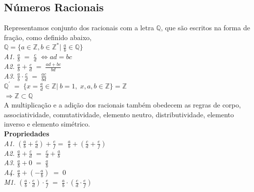 \noindent
\subsection{Números Racionais}

\noindent
Representamos conjunto dos racionais com a letra $\mathbb{Q}$, que são escritos na forma de fração, como definido abaixo, \\

\noindent
$\mathbb{Q} = \{ a \in \mathbb{Z}, b \in \mathbb{Z^*}| \; \frac{a}{b} \in \mathbb{Q} \} $ \\

\noindent
\emph{A1.} $ \frac{a}{b} \; = \; \frac{c}{d}$  $\Leftrightarrow ad = bc $ \\
\noindent
\emph{A2.} $\frac{a}{b} + \frac{c}{d} \; = \; \frac{ ad + bc }{bd}$ \\
\noindent
\emph{A3.} $ \frac{a}{b} \cdot \frac{c}{d} \; = \; \frac{ac}{bd}$ \\


\noindent
$ \mathbb{Q^{'}} \; = \; \{ x = \frac{a}{d} \in \mathbb{Z} | \ b = 1, \; x, a, b \in \mathbb{Z} \} = \mathbb{Z}  $ \\
$ \Rightarrow \mathbb{Z} \subset \mathbb{Q} $ \\

A multiplicação e a adição dos racionais também obedecem as regras de corpo, associatividade, comutatividade, elemento neutro, distributividade, elemento inverso e elemento simétrico.\\

\noindent
\textbf{Propriedades} \\

\noindent
\emph{A1.} $ (\frac{a}{b} + \frac{c}{d}) + \frac{e}{f}  = $ $\frac{a}{b} + ( \frac{c}{d} + \frac{e}{f} )$ \\

\noindent
\emph{A2.} $ \frac{a}{b} + \frac{c}{d} \; = \; \frac{c}{d} + \frac{a}{b} $ \\

\noindent
\emph{A3.} $ \frac{a}{b} + 0 \; = \; \frac{a}{b}$ \\

\noindent
\emph{A4.} $ \frac{a}{b} + ( - \frac{a}{b} ) \; = \; 0$ \\

\noindent
\emph{M1.} $ (\frac{a}{b} \cdot \frac{c}{d} ) \cdot \frac{e}{f} \; = \; \frac{a}{b} \cdot ( \frac{c}{d} \cdot \frac{e}{f} )$ \\

